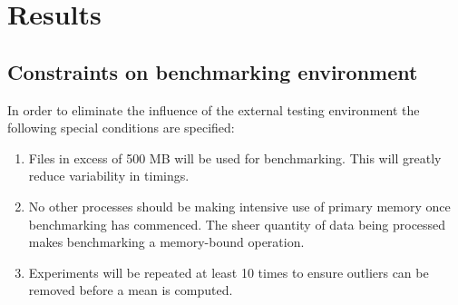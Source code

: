 \section{Results}
\subsection{Constraints on benchmarking environment}
In order to eliminate the influence of the external testing environment the following special conditions are specified:
\begin{enumerate}
 \item Files in excess of 500 MB will be used for benchmarking. This will greatly reduce variability in timings.
 \item No other processes should be making intensive use of primary memory once benchmarking has commenced. The sheer quantity of data being processed makes benchmarking a memory-bound operation.
 \item Experiments will be repeated at least 10 times to ensure outliers can be removed before a mean is computed.
\end{enumerate}
